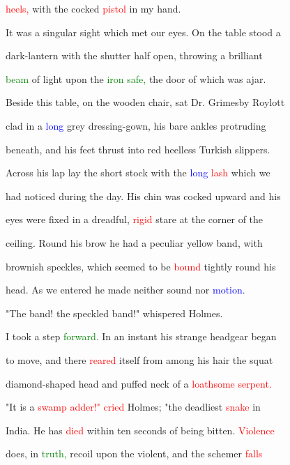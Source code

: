  \textcolor{red}{heels,} with the cocked \textcolor{red}{pistol} in my hand.



 It was a singular sight which met our eyes. On the table stood a

 dark-lantern with the shutter half open, throwing a \textcolor{BurntOrange}{brilliant}

 \textcolor{green}{beam} of light upon the \textcolor{green}{iron} \textcolor{green}{safe,} the door of which was ajar.

 Beside this table, on the wooden chair, sat Dr. Grimesby Roylott

 clad in a \textcolor{blue}{long} grey dressing-gown, his bare ankles protruding

 beneath, and his feet thrust into red heelless Turkish slippers.

 Across his lap lay the short stock with the \textcolor{blue}{long} \textcolor{red}{lash} which we

 had noticed during the day. His chin was cocked upward and his

 eyes were fixed in a \textcolor{BurntOrange}{dreadful,} \textcolor{red}{rigid} stare at the corner of the

 ceiling. Round his brow he had a peculiar yellow band, with

 brownish speckles, which seemed to be \textcolor{red}{bound} tightly round his

 head. As we entered he made neither sound nor \textcolor{blue}{motion.}



 "The band! the speckled band!" whispered Holmes.



 I took a step \textcolor{green}{forward.} In an instant his strange headgear began

 to move, and there \textcolor{red}{reared} itself from among his hair the squat

 diamond-shaped head and puffed neck of a \textcolor{red}{loathsome} \textcolor{red}{serpent.}



 "It is a \textcolor{red}{swamp} \textcolor{red}{adder!"} \textcolor{red}{cried} Holmes; "the deadliest \textcolor{red}{snake} in

 India. He has \textcolor{red}{died} within ten seconds of being bitten. \textcolor{red}{Violence}

 does, in \textcolor{green}{truth,} recoil upon the \textcolor{BurntOrange}{violent,} and the schemer \textcolor{red}{falls}


